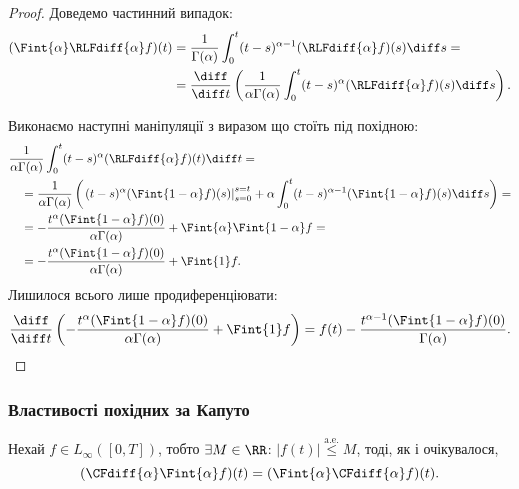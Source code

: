 \begin{proof}
    Доведемо частинний випадок:
    \begin{equation}
        \begin{aligned}
            (\Fint{\alpha} \RLFdiff{\alpha} f)(t) 
            &= \frac{1}{\Gamma(\alpha)} \int_0^t (t - s)^{\alpha - 1} (\RLFdiff{\alpha} f) (s) \diff s = \\
            &= \frac{\diff}{\diff t} \left( \frac{1}{\alpha \Gamma(\alpha)} \int_0^t (t - s)^{\alpha} (\RLFdiff{\alpha} f) (s) \diff s \right).
        \end{aligned}
    \end{equation}

    Виконаємо наступні маніпуляції з виразом що стоїть під похідною:
    \begin{equation}
        \begin{aligned}
            & \frac{1}{\alpha \Gamma(\alpha)} \int_0^t (t - s)^{\alpha} (\RLFdiff{\alpha} f) (t) \diff t = \\
            &\quad = \frac{1}{\alpha \Gamma(\alpha)} \left( \left. (t - s)^{\alpha} (\Fint{1-\alpha} f) (s) \right|_{s = 0}^{s = t} + \alpha \int_0^t (t - s)^{\alpha - 1} (\Fint{1-\alpha} f) (s) \diff s \right) = \\
            &\quad = - \frac{t^\alpha (\Fint{1 - \alpha} f)(0)}{\alpha \Gamma(\alpha)} + \Fint{\alpha} \Fint{1 - \alpha} f = \\
            &\quad = - \frac{t^\alpha (\Fint{1 - \alpha} f)(0)}{\alpha \Gamma(\alpha)} + \Fint{1} f.
        \end{aligned}
    \end{equation}
    Лишилося всього лише продиференціювати:
    \begin{equation}
        \frac{\diff}{\diff t} \left( -\frac{t^\alpha (\Fint{1 - \alpha} f)(0)}{\alpha \Gamma(\alpha)} + \Fint{1} f \right) = f(t) - \frac{t^{\alpha - 1} (\Fint{1 - \alpha} f)(0)}{\Gamma(\alpha)}.
    \end{equation}
\end{proof}

\subsubsection{Властивості похідних за Капуто}
\begin{theorem}
    Нехай $f \in L_\infty([0,T])$, тобто $\exists M \in \RR$: $|f(t)| \overset{\text{a.e.}}{\le} M$, тоді, як і очікувалося,
    \begin{equation}
        (\CFdiff{\alpha} \Fint{\alpha} f)(t) = (\Fint{\alpha} \CFdiff{\alpha} f)(t).
    \end{equation}
\end{theorem}

